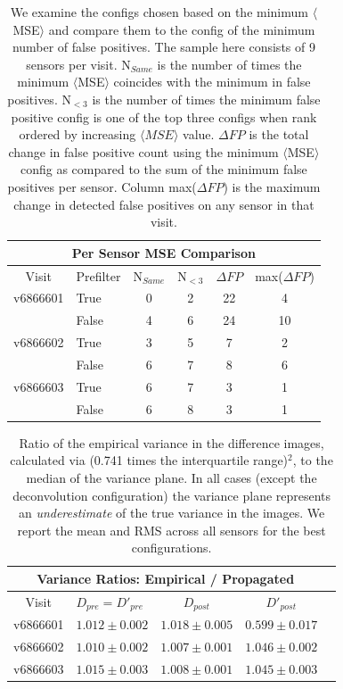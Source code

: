 \documentclass[prd, nofootinbib, floatfix, 11pt,tightenlines,times]{article}
\begin{document}
{\begin{table}
\centering
\begin{tabular}{clcccc}
\hline
\multicolumn{6}{|c|}{Per Sensor MSE Comparison} \\
\hline
Visit    & Prefilter & N$_{Same}$ & N$_{<3}$ & $\Delta FP$ & max($\Delta FP$)\\
\hline
v6866601 & True      & 0      & 2        & 22 & 4\\
         & False     & 4      & 6        & 24 & 10\\
v6866602 & True      & 3      & 5        & 7 & 2\\
         & False     & 6      & 7        & 8 & 6\\
v6866603 & True      & 6      & 7        & 3 & 1\\
         & False     & 6      & 8        & 3 & 1\\
\end{tabular}
\caption{
We examine the configs chosen based on the minimum $\langle $MSE$\rangle$ and compare them to the config of the
minimum number of false positives.  The sample here consists of 9 sensors per visit.  
N$_{Same}$ is the number of times the minimum $\langle $MSE$\rangle$ coincides with the minimum in false positives.  N$_{<3}$
is the number of times the minimum false positive config is one of the top three configs when rank ordered by increasing
$\langle MSE \rangle$ value.  $\Delta FP$
is the total change in false positive count using the minimum $\langle $MSE$\rangle$ config as compared to the sum of the minimum 
false positives per sensor.  Column max($\Delta FP$) is the maximum change in detected false positives on any sensor in that visit.
\label{tab-MSE_persensor}}
\end{table}

\clearpage

\begin{table}
\centering
\begin{tabular}{clccc}
\hline
\multicolumn{4}{|c|}{Variance Ratios: Empirical / Propagated} \\
\hline
Visit    & $D_{pre} = D'_{pre}$ & $D_{post}$ & $D'_{post}$ \\
\hline
v6866601 &$1.012 \pm 0.002$&$1.018 \pm 0.005$&$0.599 \pm 0.017$ \\
v6866602 &$1.010 \pm 0.002$&$1.007 \pm 0.001$&$1.046 \pm 0.002$ \\
v6866603 &$1.015 \pm 0.003$&$1.008 \pm 0.001$&$1.045 \pm 0.003$ \\
\end{tabular}
\caption{Ratio of the empirical variance in the difference images,
  calculated via (0.741 times the interquartile range)$^2$, to the
  median of the variance plane.  In all cases (except the deconvolution configuration) the variance plane
  represents an {\it underestimate} of the true variance in the
  images.  We report the mean and RMS across all sensors for the best
  configurations.  }
\label{tab-variance1}
\end{table}

}
\end{document}
